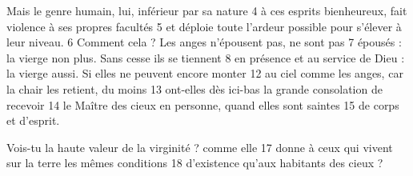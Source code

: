 Mais le genre humain, lui, inférieur par sa nature	 
4	 	à ces esprits bienheureux, fait violence à ses propres facultés	 
5	 	et déploie toute l'ardeur possible pour s'élever à leur niveau.	 
6	 	Comment cela ? Les anges n'épousent pas, ne sont pas	 
7	 	épousés : la vierge non plus. Sans cesse ils se tiennent	 
8	 	en présence et au service de Dieu : la vierge aussi.
Si elles ne peuvent encore monter	 
12	 	au ciel comme les anges, car la chair les retient, du moins	 
13	 	ont-elles dès ici-bas la grande consolation de recevoir	 
14	 	le Maître des cieux en personne, quand elles sont saintes	 
15	 	de corps et d'esprit.

Vois-tu la haute valeur de la virginité ? comme elle	 
17	 	donne à ceux qui vivent sur la terre les mêmes conditions	 
18	 	d'existence qu'aux habitants des cieux ?
